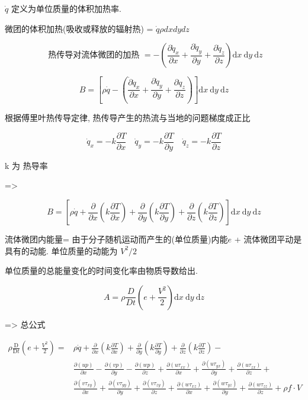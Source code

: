 \documentclass[UTF8]{ctexart}
\begin{document}
$\dot{q}$ 定义为单位质量的体积加热率.

微团的体积加热(吸收或释放的辐射热) = $\dot{q} \rho dxdydz$

$$
	\text { 热传导对流体微团的加热 }=-\left(\frac{\partial \dot{q}_{x}}{\partial x}+\frac{\partial \dot{q}_{y}}{\partial y}+\frac{\partial \dot{q}_{z}}{\partial z}\right) \mathrm{d} x \mathrm{~d} y \mathrm{~d} z
$$

$$
	B=\left[\rho \dot{q}-\left(\frac{\dot{\partial} \dot{q}_{x}}{\partial x}+\frac{\partial \dot{q}_{y}}{\partial y}+\frac{\partial \dot{q}_{z}}{\partial z}\right)\right] \mathrm{d} x \mathrm{~d} y \mathrm{~d} z
$$

根据傅里叶热传导定律, 热传导产生的热流与当地的问题梯度成正比

$$
	\dot{q}_{x}=-k \frac{\partial T}{\partial x} \quad \dot{q}_{y}=-k \frac{\partial T}{\partial y} \quad \dot{q}_{z}=-k \frac{\partial T}{\partial z}
$$

k 为 热导率

=>

$$
	B=\left[\rho \dot{q}+\frac{\partial}{\partial x}\left(k \frac{\partial T}{\partial x}\right)+\frac{\partial}{\partial y}\left(k \frac{\partial T}{\partial y}\right)+\frac{\partial}{\partial z}\left(k \frac{\partial T}{\partial z}\right)\right] \mathrm{d} x \mathrm{~d} y \mathrm{~d} z
$$

流体微团内能量= 由于分子随机运动而产生的(单位质量)内能$e$ + 流体微团平动是具有的动能. 单位质量的动能为 $V^2 / 2$

单位质量的总能量变化的时间变化率由物质导数给出.

$$
	A=\rho \frac{D}{D t}\left(e+\frac{V^{2}}{2}\right) \mathrm{d} x \mathrm{~d} y \mathrm{~d} z
$$

=> 总公式

$$
	\begin{aligned}
		\rho \frac{\mathrm{D}}{\mathrm{D} t}\left(e+\frac{V^{2}}{2}\right)= & \rho \dot{q}+\frac{\partial}{\partial x}\left(k \frac{\partial T}{\partial x}\right)+\frac{\partial}{\partial y}\left(k \frac{\partial T}{\partial y}\right)+\frac{\partial}{\partial z}\left(k \frac{\partial T}{\partial z}\right)-                                                                                                        \\
		                                                                    & \frac{\partial(u p)}{\partial x}-\frac{\partial(v p)}{\partial y}-\frac{\partial(w p)}{\partial z}+\frac{\partial\left(u \tau_{x x}\right)}{\partial x}+\frac{\partial\left(u \tau_{y x}\right)}{\partial y}+\frac{\partial\left(u \tau_{z x}\right)}{\partial z}+                                                                           \\
		                                                                    & \frac{\partial\left(v \tau_{x y}\right)}{\partial x}+\frac{\partial\left(v \tau_{y y}\right)}{\partial y}+\frac{\partial\left(v \tau_{z y}\right)}{\partial z}+\frac{\partial\left(w \tau_{x z}\right)}{\partial x}+\frac{\partial\left(w \tau_{y z}\right)}{\partial y}+\frac{\partial\left(w \tau_{z z}\right)}{\partial z}+\rho f \cdot V
	\end{aligned}
$$
\end{document}
